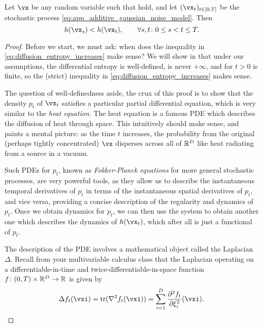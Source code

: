 \documentclass[../../book-main.tex]{subfiles}
\begin{document}
\begin{theorem}\label{thm:diffusion_entropy_increases}
    Let \(\vx\) be any random variable such that  hold, and let \((\vx_{t})_{t \in [0, T]}\) be the stochastic process \eqref{eq:app_additive_gaussian_noise_model}. Then 
    \begin{equation}\label{eq:diffusion_entropy_increases}
        h(\vx_{s}) < h(\vx_{t}), \qquad \forall s, t \colon 0 \leq s < t \leq T.
    \end{equation}
\end{theorem}
\begin{proof}
    Before we start, we must ask: when does the inequality in \eqref{eq:diffusion_entropy_increases} make sense? We will show in  that under our assumptions, the differential entropy is well-defined, is never \(+\infty\), and for \(t > 0\) is finite, so the (strict) inequality in \eqref{eq:diffusion_entropy_increases} makes sense.

    The question of well-definedness aside, the crux of this proof is to show that the density \(p_{t}\) of \(\vx_{t}\) satisfies a particular partial differential equation, which is very similar to the \textit{heat equation}. The heat equation is a famous PDE which describes the diffusion of heat through space. This intuitively should make sense, and paints a mental picture: as the time \(t\) increases, the probability from the original (perhaps tightly concentrated) \(\vx\) disperses across all of \(\mathbb{R}^{D}\) like heat radiating from a source in a vacuum.
    
    Such PDEs for \(p_{t}\), known as \textit{Fokker-Planck equations} for more general stochastic processes, are very powerful tools, as they allow us to describe the instantaneous temporal derivatives of \(p_{t}\) in terms of the instantaneous spatial derivatives of \(p_{t}\), and vice versa, providing a concise description of the regularity and dynamics of \(p_{t}\). Once we obtain dynamics for \(p_{t}\), we can then use the system to obtain another one which describes the dynamics of \(h(\vx_{t})\), which after all is just a functional of \(p_{t}\).  

    The description of the PDE involves a mathematical object called the Laplacian \(\Delta\). Recall from your multivariable calculus class that the Laplacian operating on a differentiable-in-time and twice-differentiable-in-space function \(f \colon (0, T) \times \mathbb{R}^{D} \to \mathbb{R}\) is given by
    \begin{equation}
        \Delta f_{t}(\vxi) = \tr(\nabla^{2}f_{t}(\vxi)) = \sum_{i = 1}^{D}\pddv{f_{t}}{\xi_{i}}(\vxi).
    \end{equation}
    

\end{proof}
\end{document}
